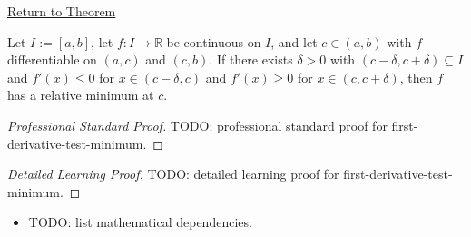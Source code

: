 \newpage
{}
\label{prf:first-derivative-test-minimum}

\begin{remark*}[Return]
\hyperref[thm:first-derivative-test-minimum]{Return to Theorem}
\end{remark*}

\begin{theorem*}
Let $I := [a,b]$, let $f : I \to \mathbb{R}$ be continuous on $I$, and let $c \in (a,b)$ with $f$ differentiable on $(a,c)$ and $(c,b)$. If there exists $\delta > 0$ with $(c-\delta,c+\delta) \subseteq I$ and $f'(x) \leq 0$ for $x \in (c-\delta,c)$ and $f'(x) \geq 0$ for $x \in (c,c+\delta)$, then $f$ has a relative minimum at $c$.
\end{theorem*}

\begin{proof}[Professional Standard Proof]
\LRAProofBodyStart
TODO: professional standard proof for first-derivative-test-minimum.
\end{proof}

\begin{proof}[Detailed Learning Proof]
\LRAProofBodyStart
TODO: detailed learning proof for first-derivative-test-minimum.
\end{proof}

\begin{remark*}
\end{remark*}

\begin{dependencies}
\begin{itemize}
  \item TODO: list mathematical dependencies.
\end{itemize}
\end{dependencies}

\clearpage
